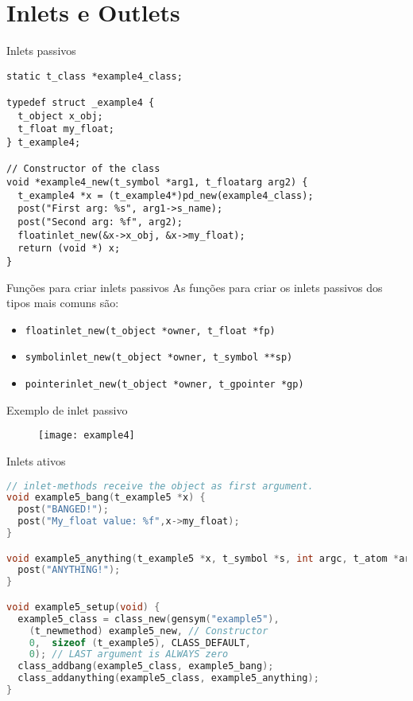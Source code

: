 \section{Inlets e Outlets}

\begin{frame}[fragile]{Inlets passivos}
\begin{lstlisting}
static t_class *example4_class;

typedef struct _example4 {
  t_object x_obj;
  t_float my_float;
} t_example4;

// Constructor of the class
void *example4_new(t_symbol *arg1, t_floatarg arg2) {
  t_example4 *x = (t_example4*)pd_new(example4_class);
  post("First arg: %s", arg1->s_name);
  post("Second arg: %f", arg2);
  floatinlet_new(&x->x_obj, &x->my_float);
  return (void *) x;
}
\end{lstlisting}
\end{frame}


\begin{frame}{Funções para criar inlets passivos}
As funções para criar os inlets passivos dos tipos mais comuns são:
\begin{itemize}
\item \texttt{floatinlet\_new(t\_object *owner, t\_float *fp)}
\item \texttt{symbolinlet\_new(t\_object *owner, t\_symbol **sp)}
\item \texttt{pointerinlet\_new(t\_object *owner, t\_gpointer *gp)}
\end{itemize}
\end{frame}


\begin{frame}{Exemplo de inlet passivo}
\begin{figure}[h!]
\centering
\texttt{[image: example4]}
\label{fig:inlet-passivo}
\end{figure}
\end{frame}


\begin{frame}[fragile]{Inlets ativos}
\begin{lstlisting}[language=C]
// inlet-methods receive the object as first argument.
void example5_bang(t_example5 *x) { 
  post("BANGED!");
  post("My_float value: %f",x->my_float);
}

void example5_anything(t_example5 *x, t_symbol *s, int argc, t_atom *argv){
  post("ANYTHING!");
}

void example5_setup(void) {
  example5_class = class_new(gensym("example5"),
    (t_newmethod) example5_new, // Constructor
    0,  sizeof (t_example5), CLASS_DEFAULT,
    0); // LAST argument is ALWAYS zero
  class_addbang(example5_class, example5_bang);
  class_addanything(example5_class, example5_anything);
}
\end{lstlisting}
\end{frame}

